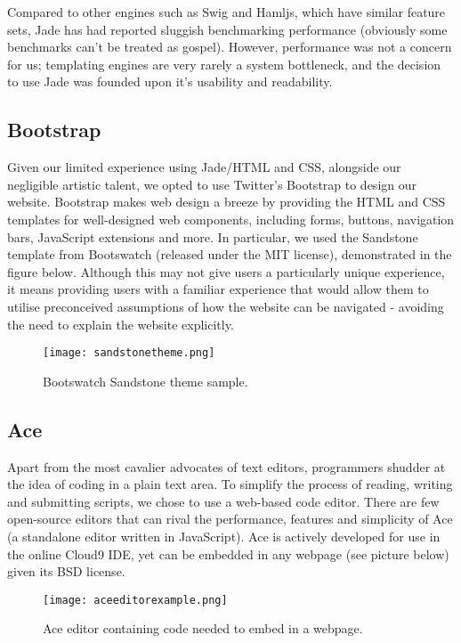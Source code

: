 \noindent Compared to other engines such as Swig and Hamljs, which have similar feature sets, Jade has had reported sluggish benchmarking performance \cite{benchmarks} (obviously some benchmarks can't be treated as gospel). However, performance was not a concern for us; templating engines are very rarely a system bottleneck, and the decision to use Jade was founded upon it's usability and readability.

\subsection{Bootstrap}
Given our limited experience using Jade/HTML and CSS, alongside our negligible artistic talent, we opted to use Twitter's Bootstrap to design our website. Bootstrap makes web design a breeze by providing the HTML and CSS templates for well-designed web components, including forms, buttons, navigation bars, JavaScript extensions and more. In particular, we used the Sandstone\cite{sandstone} template from Bootswatch (released under the MIT license), demonstrated in the figure below. Although this may not give users a particularly unique experience, it means providing users with a familiar experience that would allow them to utilise preconceived assumptions of how the website can be navigated - avoiding the need to explain the website explicitly.

\begin{figure}[H]
\centering
\texttt{[image: sandstonetheme.png]}
\caption{Bootswatch Sandstone theme sample.}
\end{figure}

\subsection{Ace}
Apart from the most cavalier advocates of text editors, programmers shudder at the idea of coding in a plain text area. To simplify the process of reading, writing and submitting scripts, we chose to use a web-based code editor. There are few open-source editors that can rival the performance, features and simplicity of Ace (a standalone editor written in JavaScript). Ace\cite{ace} is actively developed for use in the online Cloud9 IDE, yet can be embedded in any webpage (see picture below) given its BSD license.

\begin{figure}[H]
\centering
\texttt{[image: aceeditorexample.png]}
\caption{Ace editor containing code needed to embed in a webpage.}
\end{figure}

